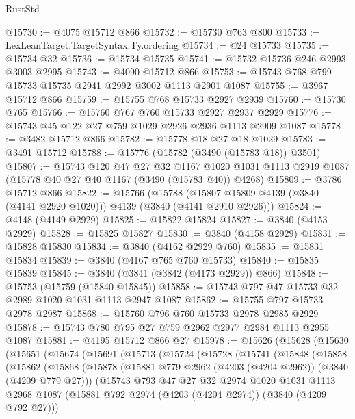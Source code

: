 \begin{lexlean}{RustStd}
\begin{coremodule}
{\begin{coremodule}
{{{{{{{{{{{{{{{{{{{{{{{{{{@15730 := @4075 @15712 @866
@15732 := @15730 @763 @800
@15733 := LexLeanTarget.TargetSyntax.Ty.ordering
@15734 := @24 @15733
@15735 := @15734 @32
@15736 := @15734 @15735
@15741 := @15732 @15736 @246 @2993 @3003 @2995
@15743 := @4090 @15712 @866
@15753 := @15743 @768 @799 @15733 @15735 @2941 @2992 @3002 @1113 @2901 @1087
@15755 := @3967 @15712 @866
@15759 := @15755 @768 @15733 @2927 @2939
@15760 := @15730 @765
@15766 := @15760 @767 @760 @15733 @2927 @2937 @2929
@15776 := @15743 @45 @122 @27 @759 @1029 @2926 @2936 @1113 @2909 @1087
@15778 := @3482 @15712 @866
@15782 := @15778 @18 @27 @18 @1029
@15783 := @3491 @15712
@15788 := @15776 (@15782 (@3490 (@15783 @18)) @3501)
@15807 := @15743
    @120
    @47
    @27
    @32
    @1167
    @1020
    @1031
    @1113
    @2919
    @1087
    (@15778 @40 @27 @40 @1167 (@3490 (@15783 @40)) @4268)
@15809 := @3786 @15712 @866
@15822 := @15766
    (@15788 (@15807 @15809 @4139 (@3840 (@4141 @2920 @1020))) @4139 (@3840 (@4141 @2910 @2926)))
@15824 := @4148 (@4149 @2929)
@15825 := @15822 @15824
@15827 := @3840 (@4153 @2929)
@15828 := @15825 @15827
@15830 := @3840 (@4158 @2929)
@15831 := @15828 @15830
@15834 := @3840 (@4162 @2929 @760)
@15835 := @15831 @15834
@15839 := @3840 (@4167 @765 @760 @15733)
@15840 := @15835 @15839
@15845 := @3840 (@3841 (@3842 (@4173 @2929)) @866)
@15848 := @15753 (@15759 (@15840 @15845))
@15858 := @15743 @797 @47 @15733 @32 @2989 @1020 @1031 @1113 @2947 @1087
@15862 := @15755 @797 @15733 @2978 @2987
@15868 := @15760 @796 @760 @15733 @2978 @2985 @2929
@15878 := @15743 @780 @795 @27 @759 @2962 @2977 @2984 @1113 @2955 @1087
@15881 := @4195 @15712 @866 @27
@15978 := @15626
    (@15628
      (@15630
        (@15651
          (@15674
            (@15691
              (@15713
                (@15724
                  (@15728
                    (@15741
                      (@15848
                        (@15858
                          (@15862
                            (@15868
                              (@15878
                                (@15881 @779 @2962 (@4203 (@4204 @2962)) (@3840 (@4209 @779 @27)))
                                (@15743
                                  @793
                                  @47
                                  @27
                                  @32
                                  @2974
                                  @1020
                                  @1031
                                  @1113
                                  @2968
                                  @1087
                                  (@15881 @792 @2974 (@4203 (@4204 @2974)) (@3840 (@4209 @792 @27)))
}}}}}}}}}}}}}}}}}}}}}}}}}}
\end{coremodule}}
\end{coremodule}
\end{lexlean}
